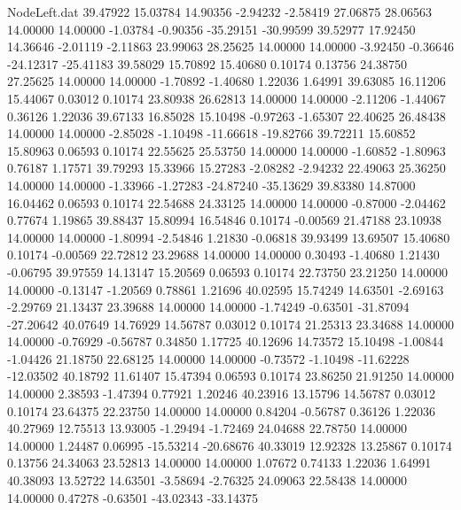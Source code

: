 \begin{filecontents}{NodeLeft.dat}
  39.47922   15.03784   14.90356    -2.94232   -2.58419   27.06875   28.06563   14.00000   14.00000   -1.03784   -0.90356  -35.29151  -30.99599
  39.52977   17.92450   14.36646    -2.01119   -2.11863   23.99063   28.25625   14.00000   14.00000   -3.92450   -0.36646  -24.12317  -25.41183
  39.58029   15.70892   15.40680     0.10174    0.13756   24.38750   27.25625   14.00000   14.00000   -1.70892   -1.40680    1.22036    1.64991
  39.63085   16.11206   15.44067     0.03012    0.10174   23.80938   26.62813   14.00000   14.00000   -2.11206   -1.44067    0.36126    1.22036
  39.67133   16.85028   15.10498    -0.97263   -1.65307   22.40625   26.48438   14.00000   14.00000   -2.85028   -1.10498  -11.66618  -19.82766
  39.72211   15.60852   15.80963     0.06593    0.10174   22.55625   25.53750   14.00000   14.00000   -1.60852   -1.80963    0.76187    1.17571
  39.79293   15.33966   15.27283    -2.08282   -2.94232   22.49063   25.36250   14.00000   14.00000   -1.33966   -1.27283  -24.87240  -35.13629
  39.83380   14.87000   16.04462     0.06593    0.10174   22.54688   24.33125   14.00000   14.00000   -0.87000   -2.04462    0.77674    1.19865
  39.88437   15.80994   16.54846     0.10174   -0.00569   21.47188   23.10938   14.00000   14.00000   -1.80994   -2.54846    1.21830   -0.06818
  39.93499   13.69507   15.40680     0.10174   -0.00569   22.72812   23.29688   14.00000   14.00000    0.30493   -1.40680    1.21430   -0.06795
  39.97559   14.13147   15.20569     0.06593    0.10174   22.73750   23.21250   14.00000   14.00000   -0.13147   -1.20569    0.78861    1.21696
  40.02595   15.74249   14.63501    -2.69163   -2.29769   21.13437   23.39688   14.00000   14.00000   -1.74249   -0.63501  -31.87094  -27.20642
  40.07649   14.76929   14.56787     0.03012    0.10174   21.25313   23.34688   14.00000   14.00000   -0.76929   -0.56787    0.34850    1.17725
  40.12696   14.73572   15.10498    -1.00844   -1.04426   21.18750   22.68125   14.00000   14.00000   -0.73572   -1.10498  -11.62228  -12.03502
  40.18792   11.61407   15.47394     0.06593    0.10174   23.86250   21.91250   14.00000   14.00000    2.38593   -1.47394    0.77921    1.20246
  40.23916   13.15796   14.56787     0.03012    0.10174   23.64375   22.23750   14.00000   14.00000    0.84204   -0.56787    0.36126    1.22036
  40.27969   12.75513   13.93005    -1.29494   -1.72469   24.04688   22.78750   14.00000   14.00000    1.24487    0.06995  -15.53214  -20.68676
  40.33019   12.92328   13.25867     0.10174    0.13756   24.34063   23.52813   14.00000   14.00000    1.07672    0.74133    1.22036    1.64991
  40.38093   13.52722   14.63501    -3.58694   -2.76325   24.09063   22.58438   14.00000   14.00000    0.47278   -0.63501  -43.02343  -33.14375

\end{filecontents}
